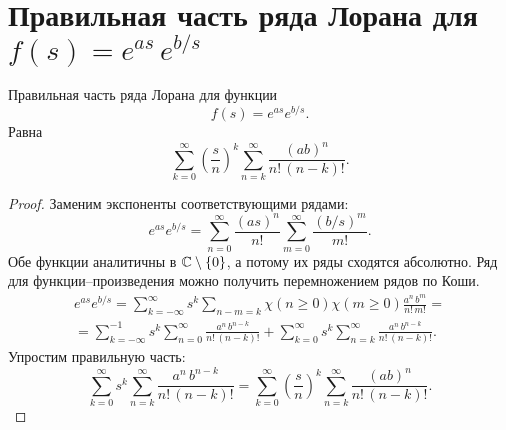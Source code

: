 \documentclass[../paper.tex]{subfiles}
\begin{document}
\section{Правильная часть ряда Лорана для $f(s) = e^{as}\,e^{b/s}$}
\begin{Th*}
Правильная часть ряда Лорана для функции
\[
    f(s) = e^{as}e^{b/s}
.\]
Равна
\[
    \sum_{k=0}^{\infty} \left(\frac{s}{n}\right)^k \sum_{n=k}^{\infty} \frac{(ab)^n}{n!\,(n-k)!}
.\]
\end{Th*}
\begin{proof}
Заменим экспоненты соответствующими рядами:
\[
    e^{as} e^{b/s} =
%
    \sum_{n=0}^{\infty} \frac{\left(as\right)^n}{n!}
    \sum_{m=0}^{\infty} \frac{\left(b/s\right)^m}{m!}
.\]
Обе функции аналитичны в $\mathbb{C} \setminus \{0\}$, а потому их ряды сходятся абсолютно. Ряд для функции--произведения можно получить перемножением рядов по Коши.
\begin{multline*}
    e^{as} e^{b/s} =
%
    \sum_{k=-\infty}^{\infty} s^k \sum_{n-m=k} \chi(n \ge 0) \chi(m \ge 0) \frac{a^n\,b^m}{n!\,m!}
=\\=
    \sum_{k=-\infty}^{-1} s^k \sum_{n=0}^{\infty} \frac{a^n\,b^{n-k}}{n!\,(n-k)!} +
    \sum_{k=0}^{\infty} s^k \sum_{n=k}^{\infty} \frac{a^n\,b^{n-k}}{n!\,(n-k)!}
.\end{multline*}
Упростим правильную часть:
\[
    \sum_{k=0}^{\infty} s^k \sum_{n=k}^{\infty} \frac{a^n\,b^{n-k}}{n!\,(n-k)!} =
    \sum_{k=0}^{\infty} \left(\frac{s}{n}\right)^k \sum_{n=k}^{\infty} \frac{(ab)^n}{n!\,(n-k)!}
.\]
\end{proof}
\end{document}
